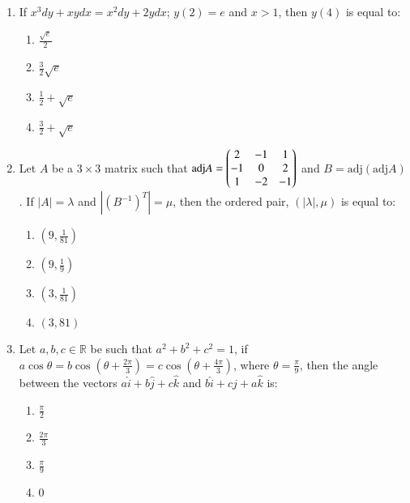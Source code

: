 \documentclass[journal,9pt,twocolumn]{IEEEtran}
\begin{document}
\begin{enumerate}
    \item  If $x^3dy + xydx = x^2dy + 2ydx$; $y(2) = e$ and $x > 1$, then $y(4)$ is equal to:
        
        \begin{multicols}{4}
\begin{enumerate}
    \item $\frac{\sqrt{e}}{2}$
    \item $\frac{3}{2} \sqrt{e}$
    \item $\frac{1}{2} + \sqrt{e}$
    \item $\frac{3}{2} + \sqrt{e}$
\end{enumerate}
\end{multicols}

\item Let $A$ be a $3 \times 3$ matrix such that $\text{adj} A = \begin{pmatrix}2 &-1& 1\\-1& 0& 2\\1& -2& -1\end{pmatrix}$ 
and $B = \text{adj}(\text{adj}  A)$. If $|A| = \lambda$ and $|(B^{-1})^T| = \mu$, then the ordered pair, $(|\lambda|, \mu)$ is equal to:

        \begin{multicols}{2}

\begin{enumerate}
    \item $(9, \frac{1}{81})$
    \item $(9, \frac{1}{9})$
    \item $(3, \frac{1}{81})$
    \item $(3, 81)$
\end{enumerate}
\end{multicols}

\item Let $a, b, c \in \mathbb{R}$ be such that $a^2 + b^2 + c^2 = 1$, if $a \cos \theta = b \cos(\theta + \frac{2\pi}{3}) = c \cos(\theta + \frac{4\pi}{3})$, where $\theta = \frac{\pi}{9}$, then the angle between the vectors $a\hat{i} + b\hat{j} + c\hat{k}$ and $b\hat{i} + c\hat{j}+ a\hat{k} $ is:
        \begin{multicols}{4}

\begin{enumerate}
    \item $\frac{\pi}{2}$
    \item $\frac{2\pi}{3}$
    \item $\frac{\pi}{9}$
    \item $0$
\end{enumerate}
\end{multicols}


\end{enumerate}
\end{document}
